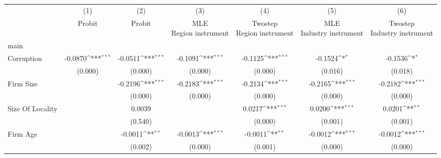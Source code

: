 {
\def\sym#1{\ifmmode^{#1}\else\(^{#1}\)\fi}
\begin{tabular}{l*{6}{c}}
\hline\hline
                    &\multicolumn{1}{c}{(1)}         &\multicolumn{1}{c}{(2)}         &\multicolumn{1}{c}{(3)}         &\multicolumn{1}{c}{(4)}         &\multicolumn{1}{c}{(5)}         &\multicolumn{1}{c}{(6)}         \\
                    &      Probit         &      Probit         &\shortstack{MLE\\Region instrument}         &\shortstack{Twostep\\Region instrument}         &\shortstack{MLE\\Industry instrument}         &\shortstack{Twostep\\Industry instrument}         \\
\hline
main                &                     &                     &                     &                     &                     &                     \\
Corruption          &     -0.0870\sym{***}&     -0.0511\sym{***}&     -0.1091\sym{***}&     -0.1125\sym{***}&     -0.1524\sym{*}  &     -0.1536\sym{*}  \\
                    &     (0.000)         &     (0.000)         &     (0.000)         &     (0.000)         &     (0.016)         &     (0.018)         \\
Firm Size           &                     &     -0.2196\sym{***}&     -0.2183\sym{***}&     -0.2134\sym{***}&     -0.2165\sym{***}&     -0.2182\sym{***}\\
                    &                     &     (0.000)         &     (0.000)         &     (0.000)         &     (0.000)         &     (0.000)         \\
Size Of Locality    &                     &      0.0039         &                     &      0.0217\sym{***}&      0.0200\sym{***}&      0.0201\sym{**} \\
                    &                     &     (0.540)         &                     &     (0.000)         &     (0.001)         &     (0.001)         \\
Firm Age            &                     &     -0.0011\sym{**} &     -0.0013\sym{***}&     -0.0011\sym{**} &     -0.0012\sym{***}&     -0.0012\sym{***}\\
                    &                     &     (0.002)         &     (0.000)         &     (0.001)         &     (0.000)         &     (0.000)         \\

\end{tabular}}
